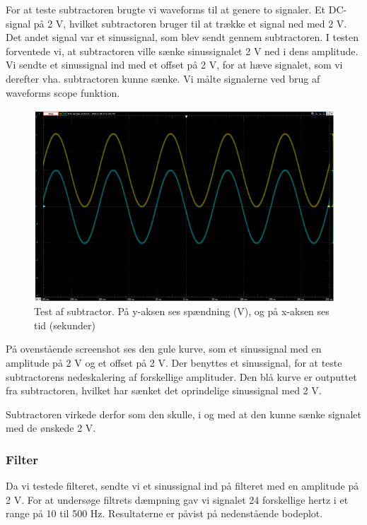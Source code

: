 For at teste subtractoren brugte vi waveforms til at genere to signaler. Et DC-signal på 2 V, hvilket subtractoren bruger til at trække et signal ned med 2 V. Det andet signal var et sinussignal, som blev sendt gennem subtractoren. I testen forventede vi, at subtractoren ville sænke sinussignalet 2 V ned i dens amplitude. Vi sendte et sinussignal ind med et offset på 2 V, for at hæve signalet, som vi derefter vha. subtractoren kunne sænke. Vi målte signalerne ved brug af waveforms scope funktion.

\begin{figure}[h!]
	\centering
	\includegraphics[width=0.72\linewidth]{../Rapport/Implementering_og_test/Hardware/subtractor}
	\caption{Test af subtractor. På y-aksen ses spændning (V), og på x-aksen ses tid (sekunder)}
	\label{fig:subtractor}
\end{figure}

På ovenstående screenshot ses den gule kurve, som et sinussignal med en amplitude på 2 V og et offset på 2 V. Der benyttes et sinussignal, for at teste subtractorens nedeskalering af forskellige amplituder. Den blå kurve er outputtet fra subtractoren, hvilket har sænket det oprindelige sinussignal med 2 V.

Subtractoren virkede derfor som den skulle, i og med at den kunne sænke signalet med de ønskede 2 V.


\subsubsection{Filter}

Da vi testede filteret, sendte vi et sinussignal ind på filteret med en amplitude på 2 V. For at undersøge filtrets dæmpning gav vi signalet 24 forskellige hertz i et range på 10 til 500 Hz. Resultaterne er påvist på nedenstående bodeplot.

